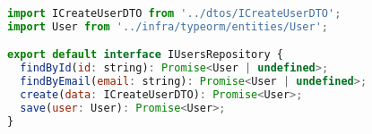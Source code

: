 \begin{lstlisting}[language=JavaScript, caption={IUsersRepository.ts},captionpos=b, label=alg:iusersrepository]
import ICreateUserDTO from '../dtos/ICreateUserDTO';
import User from '../infra/typeorm/entities/User';

export default interface IUsersRepository {
  findById(id: string): Promise<User | undefined>;
  findByEmail(email: string): Promise<User | undefined>;
  create(data: ICreateUserDTO): Promise<User>;
  save(user: User): Promise<User>;
}
\end{lstlisting}